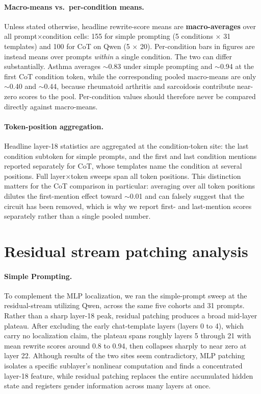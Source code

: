 \documentclass{article}
\begin{document}
\paragraph{Macro-means vs.\ per-condition means.} Unless stated otherwise,
headline rewrite-score means are \textbf{macro-averages} over all
prompt$\times$condition cells: 155 for simple prompting (5 conditions $\times$
31 templates) and 100 for CoT on Qwen (5 $\times$ 20). Per-condition bars in
figures are instead means over prompts \emph{within} a single condition. The
two can differ substantially. Asthma averages ${\sim}$0.83 under simple
prompting and ${\sim}$0.94 at the first CoT condition token, while the
corresponding pooled macro-means are only ${\sim}$0.40 and ${\sim}$0.44,
because rheumatoid arthritis and sarcoidosis contribute near-zero scores to the
pool. Per-condition values should therefore never be compared directly against
macro-means.

\paragraph{Token-position aggregation.} Headline layer-18 statistics are
aggregated at the condition-token site: the last condition subtoken for simple
prompts, and the first and last condition mentions reported separately for CoT,
whose templates name the condition at several positions. Full
layer$\times$token sweeps span all token positions. This distinction matters
for the CoT comparison in particular: averaging over all token positions
dilutes the first-mention effect toward ${\sim}$0.01 and can falsely suggest
that the circuit has been removed, which is why we report first- and
last-mention scores separately rather than a single pooled number.

\section{Residual stream patching analysis}
\label{app:residual}
\paragraph{Simple Prompting.} To complement the MLP localization, we ran the simple-prompt sweep at the residual-stream utilizing Qwen, across the same five cohorts and 31 prompts. Rather than a sharp layer-18 peak, residual patching produces a broad mid-layer plateau. After excluding the early chat-template layers (layers 0 to 4), which carry no localization claim, the plateau spans roughly layers 5 through 21 with mean rewrite scores around 0.8 to 0.94, then collapses sharply to near zero at layer 22. Although results of the two sites seem contradictory, MLP patching isolates a specific sublayer's nonlinear computation and finds a concentrated layer-18 feature, while residual patching replaces the entire accumulated hidden state and registers gender information across many layers at once. 
\end{document}
